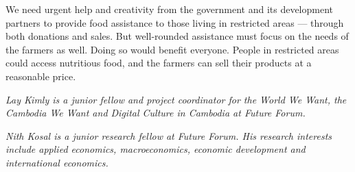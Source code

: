 \documentclass[10pt,a4paper]{letter}
\begin{document}
We need urgent help and creativity from the government and its development partners to provide food assistance to those living in restricted areas --- through both donations and sales. But well-rounded assistance must focus on the needs of the farmers as well. Doing so would benefit everyone. People in restricted areas could access nutritious food, and the farmers can sell their products at a reasonable price.


\textit{Lay Kimly is a junior fellow and project coordinator for the World We Want, the Cambodia We Want and Digital Culture in Cambodia at Future Forum.}

\textit{Nith Kosal is a junior research fellow at Future Forum. His research interests include applied economics, macroeconomics, economic development and international economics.}
\end{document}
